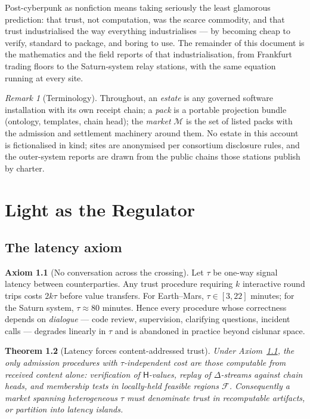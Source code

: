 \documentclass[11pt,a4paper]{report}
\newtheorem{theorem}{Theorem}[chapter]
\theoremstyle{definition}
\newtheorem{axiom}[theorem]{Axiom}
\theoremstyle{remark}
\newtheorem{remark}[theorem]{Remark}
\newcommand{\Mkt}{\mathcal{M}}
\newcommand{\Hash}{\mathsf{H}}
\newcommand{\del}{\Delta}
\newcommand{\Feas}{\mathcal{F}}
\newcommand{\lat}{\tau}
\begin{document}
Post-cyberpunk as nonfiction means taking seriously the least glamorous
prediction: that trust, not computation, was the scarce commodity, and
that trust industrialised the way everything industrialises --- by
becoming cheap to verify, standard to package, and boring to use. The
remainder of this document is the mathematics and the field reports of
that industrialisation, from Frankfurt trading floors to the Saturn-system
relay stations, with the same equation running at every site.

\begin{remark}[Terminology]
Throughout, an \emph{estate} is any governed software installation with
its own receipt chain; a \emph{pack} is a portable projection bundle
(ontology, templates, chain head); the \emph{market} \(\Mkt\) is the set
of listed packs with the admission and settlement machinery around them.
No estate in this account is fictionalised in kind; sites are anonymised
per consortium disclosure rules, and the outer-system reports are drawn
from the public chains those stations publish by charter.
\end{remark}

\chapter{Light as the Regulator}

\section{The latency axiom}

\begin{axiom}[No conversation across the crossing]\label{ax:light}
Let $\lat$ be one-way signal latency between counterparties. Any trust
procedure requiring $k$ interactive round trips costs $2k\lat$ before
value transfers. For Earth--Mars, $\lat \in [3, 22]$ minutes; for the
Saturn system, $\lat \approx 80$ minutes. Hence every procedure whose
correctness depends on \emph{dialogue} --- code review, supervision,
clarifying questions, incident calls --- degrades linearly in $\lat$ and
is abandoned in practice beyond cislunar space.
\end{axiom}

\begin{theorem}[Latency forces content-addressed trust]\label{thm:latency}
Under Axiom~\ref{ax:light}, the only admission procedures with
$\lat$-independent cost are those computable from received content alone:
verification of $\Hash$-values, replay of $\del$-streams against chain
heads, and membership tests in locally-held feasible regions $\Feas$.
Consequently a market spanning heterogeneous $\lat$ must denominate trust
in recomputable artifacts, or partition into latency islands.
\end{theorem}
\end{document}
